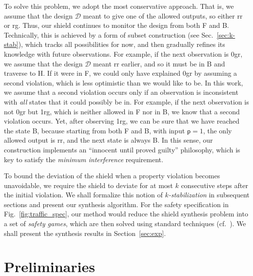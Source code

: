 \documentclass{llncs}
\newcommand{\design}{\mathcal{D}}
\begin{document}
To solve this problem, we adopt the most conservative approach. That is, 
we assume that the design $\design$ meant to give one of the allowed 
outputs, so either \textsf{rr} or \textsf{rg}. Thus, our shield 
continues to monitor the design from both F and B.  Technically, this is 
achieved by a form of subset construction (see Sec.~\ref{sec:k-stab}), 
which tracks all possibilities for now, and then gradually refines its 
knowledge with future observations.  For example, if the next 
observation is \textsf{0gr}, we assume that the design $\design$ meant 
\textsf{rr} earlier, and so it must be in B and traverse to H.
If it were in F, we could only have explained \textsf{0gr} by assuming a 
second violation, which is less optimistic than we would like to be.  
In this work, we assume that a second violation occurs only if an 
observation is inconsistent with \emph{all} states that it could 
possibly be in.  For example, if the next observation is not 
\textsf{0gr} but \textsf{1rg}, which is neither allowed in F nor in B, 
we know that a second violation occurs.  Yet, after observing 
\textsf{1rg}, we can be sure that we have reached the state B, because 
starting from both F and B, with input $\textsf{p}=1$, the only allowed 
output is \textsf{rr}, and the next state is always B.
In this sense, our construction implements an ``innocent until proved 
guilty'' philosophy, which is key to satisfy the \emph{minimum 
interference} requirement.

To bound the deviation of the shield when a property violation becomes 
unavoidable, we require the shield to deviate for at most $k$ 
consecutive steps after the initial violation.  We shall formalize this 
notion of \emph{$k$-stabilization} in subsequent sections and present 
our synthesis algorithm.
For the safety specification in Fig.~\ref{fig:traffic_spec}, our method 
would reduce the shield synthesis problem into a set of \emph{safety 
games}, which are then solved using standard techniques 
(cf.~\cite{Mazala01}).  We shall present the synthesis results in 
Section~\ref{sec:exp}.

\section{Preliminaries}
\label{sec:prelim}
\end{document}
